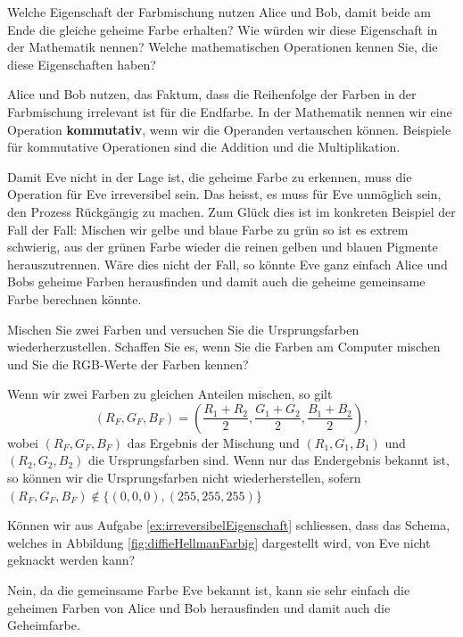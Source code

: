 \begin{myexercise}\label{ex:kommutativEigenschaft}
	Welche Eigenschaft der Farbmischung nutzen Alice und Bob, damit beide am Ende die gleiche geheime Farbe erhalten? Wie würden wir diese Eigenschaft in der Mathematik nennen? Welche mathematischen Operationen kennen Sie, die diese Eigenschaften haben?
	\begin{myanswer}
		Alice und Bob nutzen, das Faktum, dass die Reihenfolge der Farben in der Farbmischung irrelevant ist für die Endfarbe. In der Mathematik nennen wir eine Operation \textbf{kommutativ}, wenn wir die Operanden vertauschen können. Beispiele für kommutative Operationen sind die Addition und die Multiplikation. 
	\end{myanswer}
\end{myexercise}

Damit Eve nicht in der Lage ist, die geheime Farbe zu erkennen, muss die Operation für Eve irreversibel sein. Das heisst, es muss für Eve unmöglich sein, den Prozess Rückgängig zu machen. Zum Glück dies ist im konkreten Beispiel der Fall der Fall: Mischen wir gelbe und blaue Farbe zu grün so ist es extrem schwierig, aus der grünen Farbe wieder die reinen gelben und blauen Pigmente herauszutrennen. Wäre dies nicht der Fall, so könnte Eve ganz einfach Alice und Bobs geheime Farben herausfinden und damit auch die geheime gemeinsame Farbe berechnen könnte. 

\begin{myexercise}\label{ex:irreversibelEigenschaft}
	Mischen Sie zwei Farben und versuchen Sie die Ursprungsfarben wiederherzustellen. Schaffen Sie es, wenn Sie die Farben am Computer mischen und Sie die RGB-Werte der Farben kennen?
	\begin{myanswer}
		Wenn wir zwei Farben zu gleichen Anteilen mischen, so gilt $$(R_F, G_F, B_F)=(\frac{R_1+R_2}{2}, \frac{G_1+G_2}{2}, \frac{B_1+B_2}{2}),$$ wobei $(R_F, G_F, B_F)$ das Ergebnis der Mischung und $(R_1, G_1, B_1)$ und $(R_2, G_2, B_2)$ die Ursprungsfarben sind. Wenn nur das Endergebnis bekannt ist, so können wir die Ursprungsfarben nicht wiederherstellen, sofern $(R_F,G_F,B_F)\notin \{(0, 0, 0), (255, 255, 255)\}$
	\end{myanswer}
\end{myexercise}

\begin{myexercise}\label{ex:abbildungUnsicher}
	Können wir aus Aufgabe \ref{ex:irreversibelEigenschaft} schliessen, dass das Schema, welches in Abbildung \ref{fig:diffieHellmanFarbig} dargestellt wird, von Eve nicht geknackt werden kann?
	\begin{myanswer}
		Nein, da die gemeinsame Farbe Eve bekannt ist, kann sie sehr einfach die geheimen Farben von Alice und Bob herausfinden und damit auch die Geheimfarbe. 
	\end{myanswer}
\end{myexercise}

